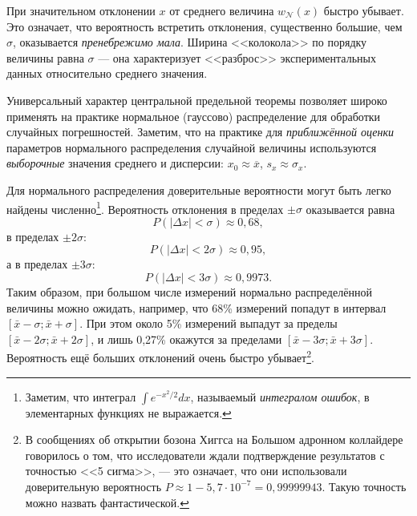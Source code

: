 %     


При значительном отклонении $x$ от среднего величина $w_{\mathcal{N}}\!\left(x\right)$
быстро убывает. Это означает, что вероятность встретить отклонения,
существенно большие, чем $\sigma$, оказывается \emph{пренебрежимо
мала}. Ширина <<колокола>> по порядку величины
равна $\sigma$ --- она характеризует <<разброс>>
экспериментальных данных относительно среднего значения.


Универсальный характер центральной предельной теоремы позволяет широко
применять на практике нормальное (гауссово) распределение для обработки
случайных погрешностей. Заметим, что на практике для \emph{приближённой
оценки} параметров нормального распределения случайной величины используются
\emph{выборочные} значения среднего и дисперсии: $x_{0}\approx\overline{x}$,
$s_{x}\approx\sigma_{x}$.

Для нормального распределения доверительные вероятности могут быть
легко найдены численно\footnote{Заметим, что интеграл $\int e^{-x^{2}/2}dx$, называемый \emph{интегралом
ошибок}, в элементарных функциях не выражается.}. Вероятность отклонения в пределах $\pm\sigma$ оказывается равна
\[
P\!\left(\left|\Delta x\right|<\sigma\right)\approx0{,}68,
\]
в пределах $\pm2\sigma$:
\[
P\!\left(\left|\Delta x\right|<2\sigma\right)\approx0{,}95,
\]
а в пределах $\pm3\sigma$:
\[
P\left(\left|\Delta x\right|<3\sigma\right)\approx0{,}9973.
\]
Таким образом, при большом числе измерений нормально распределённой
величины можно ожидать, например, что 68\% измерений попадут в интервал
$\left[\bar{x}-\sigma;\bar{x}+\sigma\right]$. При этом около 5\%
измерений выпадут за пределы $\left[\bar{x}-2\sigma;\bar{x}+2\sigma\right]$,
и лишь 0,27\% окажутся за пределами $\left[\bar{x}-3\sigma;\bar{x}+3\sigma\right]$.
Вероятность ещё больших отклонений очень быстро убывает\footnote{В сообщениях об открытии бозона Хиггса на Большом адронном коллайдере
говорилось о том, что исследователи ждали подтверждение результатов
с точностью <<5 сигма>>, ---
это означает, что они использовали доверительную вероятность $P\approx1-5{,}7\cdot10^{-7}=0{,}99999943$.
Такую точность можно назвать фантастической.}.

